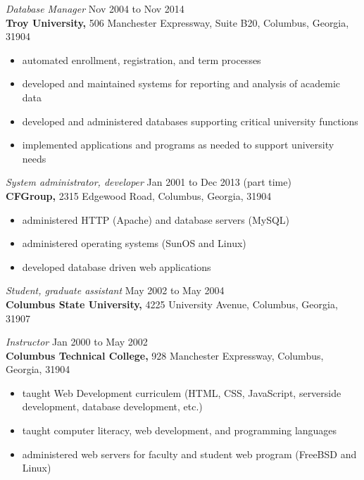 \documentclass[margin, 10pt]{res} %
\begin{document}
\begin{resume}
{\it Database Manager} \hfill Nov 2004 to Nov 2014 \\
\textbf{Troy University,} 506 Manchester Expressway, Suite B20, Columbus, Georgia, 31904

\begin{itemize} \itemsep -2pt %
\item automated enrollment, registration, and term processes
\item developed and maintained systems for reporting and analysis of academic data
\item developed and administered databases supporting critical university functions 
\item implemented applications and programs as needed to support university needs 
\end{itemize}
 
{\it System administrator, developer} \hfill Jan 2001 to Dec 2013 (part time) \\
\textbf{CFGroup,} 2315 Edgewood Road, Columbus, Georgia, 31904

\begin{itemize} \itemsep -2pt %
\item administered HTTP (Apache) and database servers (MySQL)
\item administered operating systems (SunOS and Linux)
\item developed database driven web applications
\end{itemize}
 
{\it Student, graduate assistant} \hfill May 2002 to May 2004 \\
\textbf{Columbus State University,} 4225 University Avenue, Columbus, Georgia, 31907


{\it Instructor} \hfill Jan 2000 to May 2002 \\
\textbf{Columbus Technical College,} 928 Manchester Expressway, Columbus, Georgia, 31904

\begin{itemize} \itemsep -2pt %
        \item taught Web Development curriculem (HTML, CSS, JavaScript, serverside development, database development, etc.)
\item taught computer literacy, web development, and programming languages
\item administered web servers for faculty and student web program (FreeBSD and Linux)
\end{itemize}


\end{resume}
\end{document}
